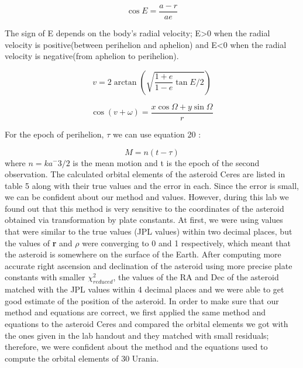 \documentclass[letterpaper,12pt]{article}
\begin{document}
\begin{equation}
\cos E = \frac{a-r}{ae}
\end{equation}

The sign of E depends on the body's radial velocity; E>0 when the radial velocity is positive(between perihelion and aphelion) and E<0 when the radial velocity is negative(from aphelion to perihelion).

\begin{equation}
v = 2\arctan(\sqrt{\frac{1+e}{1-e}\tan E/2})
\end{equation}

\begin{equation}
\cos (v+\omega) = \frac{x \cos \Omega + y \sin \Omega}{r} 
\end{equation}


For the epoch of perihelion, \begin{math} \tau \end{math} we can use equation 20 :

\begin{equation}
M = n(t-\tau)
\end{equation}
where \begin{math} n=ka^-3/2 \end{math} is the mean motion and t is the epoch of the second observation. The calculated orbital elements of the asteroid Ceres are listed in table 5 along with their true values and the error in each. Since the error is small, we can be confident about our method and values. However, during this lab we found out that this method is very sensitive to the coordinates of the asteroid obtained via transformation by plate constants. At first, we were using values that were similar to the true values (JPL values) within two decimal places, but the values of {\bf r} and \begin{math} \rho \end{math} were converging to 0 and 1 respectively, which meant that the asteroid is somewhere on the surface of the Earth. After computing more accurate right ascension and declination of the asteroid using more precise plate constants with smaller \begin{math} \chi_{reduced}^2 \end{math}, the values of the RA and Dec of the asteroid matched with the JPL values within 4 decimal places and we were able to get good estimate of the position of the asteroid.
In order to make sure that our method and equations are correct, we first applied the same method and equations to the asteroid Ceres and compared the orbital elements we got with the ones given in the lab handout and they matched with small residuals; therefore, we were confident about the method and the equations used to compute the orbital elements of 30 Urania.
\end{document}
